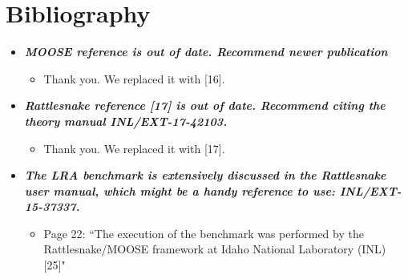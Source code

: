 \documentclass{elsarticle}
\newcommand{\done}{\checkmark}
\newcommand{\easy}[1]{\textbf{\textit{#1}}}
\begin{document}
\section*{Bibliography}

\begin{itemize}

\item[\done] \easy{ MOOSE reference is out of date. Recommend newer publication }
\begin{itemize}
\item Thank you. We replaced it with [16].
\end{itemize}

\item[\done] \easy{ Rattlesnake reference [17] is out of date. Recommend citing the theory manual INL/EXT-17-42103. }
\begin{itemize}
\item Thank you. We replaced it with [17].
\end{itemize}

\item[\done] \easy{ The LRA benchmark is extensively discussed in the Rattlesnake user manual, which might be a handy reference to use: INL/EXT-15-37337. }
\begin{itemize}
\item Page 22: ``The execution of the benchmark was performed by the Rattlesnake/MOOSE framework at Idaho National Laboratory (INL) [25]"
\end{itemize}

\end{itemize}
\end{document}
